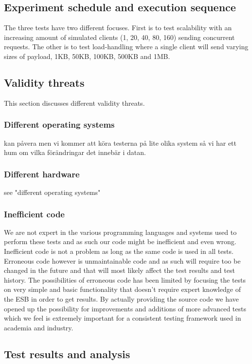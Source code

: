 \subsection{Experiment schedule and execution sequence}
The three tests have two different focuses. First is to test scalability with an increasing amount of simulated clients (1, 20, 40, 80, 160) sending concurrent requests. 
The other is to test load-handling where a single client will send varying sizes of payload, 1KB, 50KB, 100KB, 500KB and 1MB.
\subsection{Validity threats}
This section discusses different validity threats.
\subsubsection{Different operating systems}
kan påvera men vi kommer att köra testerna på lite olika system så vi har ett hum om vilka förändringar det innebär i datan.
\subsubsection{Different hardware}
see "different operating systems"
\subsubsection{Inefficient code}
We are not expert in the various programming languages and systems used to perform these tests and as such our code might be inefficient and even wrong. Inefficient code is not a problem as long as the same code is used in all tests. Erroneous code however is unmaintainable code and as such will require too be changed in the future and that will most likely affect the test results and test history. 
The possibilities of erroneous code has been limited by focusing the tests on very simple and basic functionality that doesn't require expert knowledge of the ESB in order to get results.
By actually providing the source code we have opened up the possibility for improvements and additions of more advanced tests which we feel is extremely important for a consistent testing framework used in academia and industry.

\subsection{Test results and analysis}

